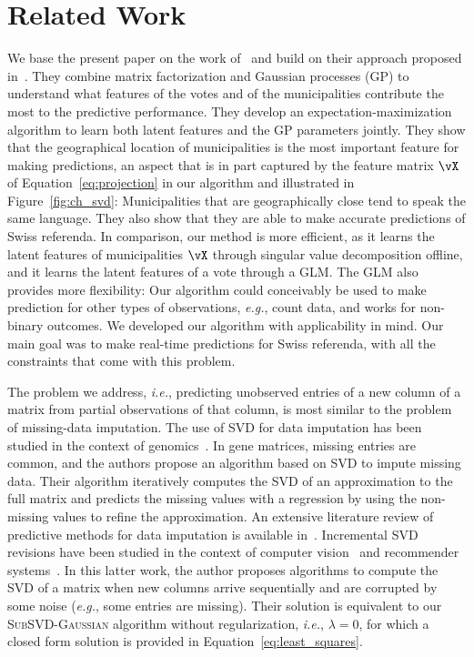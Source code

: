 \section{Related Work}%
\label{sec:relwork}

We base the present paper on the work of~\citet{etter2014mining} and build on their approach proposed in~\cite{etter2016online}.
They combine matrix factorization and Gaussian processes (GP) to understand what features of the votes and of the municipalities contribute the most to the predictive performance.
They develop an expectation-maximization algorithm to learn both latent features and the GP parameters jointly.
They show that the geographical location of municipalities is the most important feature for making predictions, an aspect that is in part captured by the feature matrix $\vX$ of Equation~\eqref{eq:projection} in our algorithm and illustrated in Figure~\ref{fig:ch_svd}:
Municipalities that are geographically close tend to speak the same language.
They also show that they are able to make accurate predictions of Swiss referenda.
In comparison, our method is more efficient, as it learns the latent features of municipalities $\vX$ through singular value decomposition offline, and it learns the latent features of a vote through a GLM.
The GLM also provides more flexibility:
Our algorithm could conceivably be used to make prediction for other types of observations, \textit{e.g.}, count data, and works for non-binary outcomes.
We developed our algorithm with applicability in mind.
Our main goal was to make real-time predictions for Swiss referenda, with all the constraints that come with this problem.

The problem we address, \textit{i.e.}, predicting unobserved entries of a new column of a matrix from partial observations of that column, is most similar to the problem of missing-data imputation.
The use of SVD for data imputation has been studied in the context of genomics~\citep{troyanskaya2001missing,hastie1999imputing}.
In gene matrices, missing entries are common, and the authors propose an algorithm based on SVD to impute missing data.
Their algorithm iteratively computes the SVD of an approximation to the full matrix and predicts the missing values with a regression by using the non-missing values to refine the approximation.
An extensive literature review of predictive methods for data imputation is available in~\citet{bertsimas2017predictive}.
Incremental SVD revisions have been studied in the context of computer vision~\citep{brand2002incremental} and recommender systems~\citep{brand2003fast}.
In this latter work, the author proposes algorithms to compute the SVD of a matrix when new columns arrive sequentially and are corrupted by some noise (\textit{e.g.}, some entries are missing).
Their solution is equivalent to our \textsc{SubSVD-Gaussian} algorithm without regularization, \textit{i.e.}, $\lambda=0$, for which a closed form solution is provided in Equation~\eqref{eq:least_squares}.

